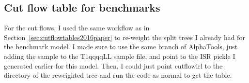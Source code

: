 \subsection{Cut flow table for benchmarks}

For the cut flows, I used the same workflow as in Section~\ref{sec:cutflowtables2016paper} to re-weight the split trees I already had for the benchmark model. I made sure to use the same branch of AlphaTools, just adding the sample to the T1qqqqLL sample file, and point to the ISR pickle I generated earlier for this model. Then, I could just point cutflowirl to the directory of the reweighted tree and run the code as normal to get the table.

\begin{table}[H]
\caption{Cut flow table for \texttt{T2tt-4bd} model.}
\end{table}

